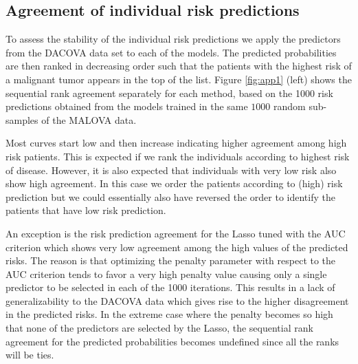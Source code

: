 \documentclass[12pt,a4paper]{article}
\theoremstyle{plain}
\begin{document}
\subsection{Agreement of individual risk predictions}
\label{sec:airp}
To assess the stability of the individual risk predictions we apply
the predictors from the DACOVA data set to each of the models. The
predicted probabilities are then ranked in decreasing order such that the
patients with the highest risk of a malignant tumor appears in the top
of the list. Figure \ref{fig:app1} (left) shows the sequential rank
agreement separately for each method, based on the 1000 risk predictions
obtained from the models trained in the same $1000$ random sub-samples
of the MALOVA data.

Most curves start low and then increase indicating higher agreement
among high risk patients. This is expected if we rank the individuals
according to highest risk of disease. However, it is also expected
that individuals with very low risk also show high agreement. In this
case we order the patients according to (high) risk prediction but we
could essentially also have reversed the order to identify the
patients that have low risk prediction.

An exception is the risk prediction agreement for the Lasso tuned with the AUC criterion which
shows very low agreement among the high values of the predicted
risks. The reason is that optimizing the penalty parameter with
respect to the AUC criterion tends to favor a very high penalty value
causing only a single predictor to be selected in each of the 1000
iterations. This results in a lack of generalizability to the DACOVA
data which gives rise to the higher disagreement in the predicted risks.
In the extreme case where the penalty becomes so high
that none of the predictors are selected by the Lasso, the sequential
rank agreement for the predicted probabilities becomes undefined since
all the ranks will be ties.
\end{document}
